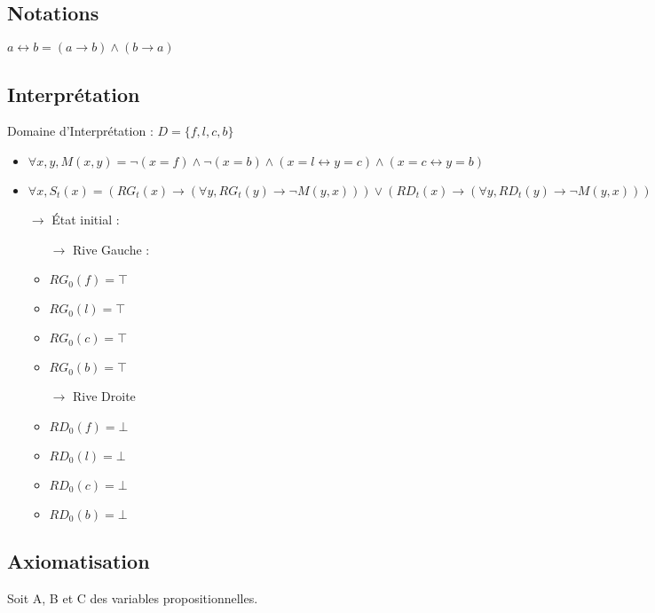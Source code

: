 \documentclass{article}
\begin{document}
\subsection{Notations}
$ a \leftrightarrow b = (a \rightarrow b) \wedge  (b \rightarrow a)$
\subsection{Interprétation}
Domaine d'Interprétation : $D = \{f,l,c,b\}$
\begin{itemize}
  \item $\forall x,y , M(x,y) = \neg(x=f) \wedge \neg(x=b) \wedge (x=l \leftrightarrow y=c) \wedge (x=c \leftrightarrow y=b)$
  \item $\forall x , S_t(x) = (RG_t(x) \to (\forall y , RG_t(y) \to \neg M(y,x) )) \vee (RD_t(x) \to (\forall y , RD_t(y) \to \neg M(y,x) )) $
  \item[$ \to $] État initial :
    \begin{itemize}
      \item[$ \to $] Rive Gauche :
      \item $ RG_0(f) = \top $
      \item $ RG_0(l) = \top $
      \item $ RG_0(c) = \top $
      \item $ RG_0(b) = \top $
      \item[$ \to $] Rive Droite
      \item $ RD_0(f) = \bot $
      \item $ RD_0(l) = \bot $
      \item $ RD_0(c) = \bot $
      \item $ RD_0(b) = \bot $
    \end{itemize}

\end{itemize}


\subsection{Axiomatisation}
Soit A, B et C des variables propositionnelles.
\end{document}
